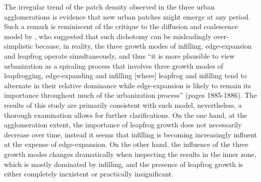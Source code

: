 The irregular trend of the patch density observed in the three urban agglomerations is evidence that new urban patches might emerge at any period.
Such a remark is reminiscent of the critique to the diffusion and coalescence model by \cite{li2013quantifying}, who suggested that such dichotomy can be misleadingly over-simplistic because, in reality, the three growth modes of infilling, edge-expansion and leapfrog operate simultaneously, and thus ``it is more plausible to view urbanization as a spiraling process that involves three growth modes of leapfrogging, edge-expanding and infilling [where] leapfrog and infilling tend to alternate in their relative dominance while edge-expansion is likely to remain its importance throughout much of the urbanization process'' (pages 1885-1886).
The results of this study are primarily consistent with such model, nevertheless, a thorough examination allows for further clarifications.
On the one hand, at the agglomeration extent, the importance of leapfrog growth does not necessarily decrease over time, instead it seems that infilling is becoming increasingly influent at the expense of edge-expansion.
On the other hand, the influence of the three growth modes changes dramatically when inspecting the results in the inner zone, which is mostly dominated by infilling, and the presence of leapfrog growth is either completely inexistent or practically insignificant.
